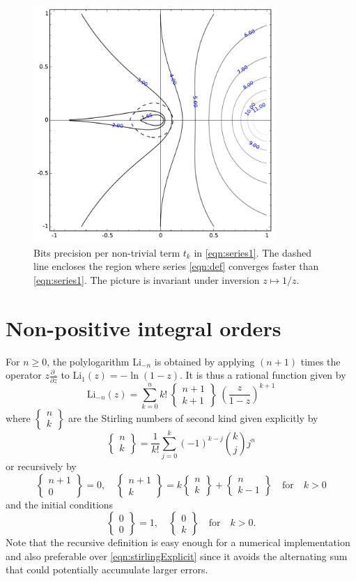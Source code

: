 \documentclass[utopia]{nmd/article}
\def\Li{\mathrm{Li}}
\def\Stirling#1#2{\left\{\!\begin{array}{c}#1\\#2\!\end{array}\right\}}
\begin{document}
\begin{figure}
\begin{center}
\includegraphics[height=9cm]{implementation_polylog_speed.pdf}
\end{center}
\caption{Bits precision per non-trivial term $t_k$ in \eqref{eqn:series1}. The dashed line encloses the region where series \eqref{eqn:def} converges faster than \eqref{eqn:series1}. The picture is invariant under inversion $z\mapsto 1/z$.}
\label{fig:convergenceSpeed}
\end{figure}




\section{Non-positive integral orders}

For $n\geq 0$, the polylogarithm $\Li_{-n}$ is obtained by applying $(n+1)$ times the operator $z \frac{\partial \_}{\partial z}$ to $\Li_1(z)=-\ln(1-z)$. It is thus a rational function given by %
$$\Li_{-n}(z) = \sum_{k=0}^n k!~ \Stirling{n+1}{k+1} ~ \left(\frac{z}{1-z}\right)^{k+1}$$
where $\Stirling{n}{k}$ are the Stirling numbers of second kind given explicitly by
\begin{equation} \label{eqn:stirlingExplicit}
\Stirling{n}{k} = \frac{1}{k!} \sum_{j=0}^k (-1)^{k-j} {k \choose j} j^n
\end{equation}
or recursively by
$$\Stirling{n+1}{0} = 0,\quad \Stirling{n+1}{k} = k \Stirling{n}{k} + \Stirling{n}{k-1}\quad\mbox{for}\quad k > 0$$
and the initial conditions $$\Stirling{0}{0}=1,\quad \Stirling{0}{k}\quad\mbox{for}\quad k > 0.$$
Note that the recursive definition is easy enough for a numerical implementation and also preferable over 
\eqref{eqn:stirlingExplicit} since it avoids the alternating sum that could potentially accumulate larger errors.
\end{document}
